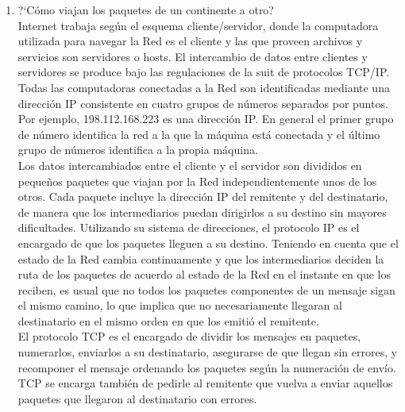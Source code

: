 \documentclass{article}
\begin{document}
\begin{enumerate}
\item ?`C\'omo viajan los paquetes de un continente a otro?\\
Internet trabaja seg\'un el esquema cliente/servidor, donde la computadora utilizada para navegar la Red es el cliente y las que proveen archivos y servicios son servidores o hosts. El intercambio de datos entre clientes y servidores se produce bajo las regulaciones de la suit de protocolos TCP/IP.\\ 
Todas las computadoras conectadas a la Red son identificadas mediante una direcci\'on IP consistente en cuatro grupos de n\'umeros separados por puntos. Por ejemplo, 198.112.168.223 es una direcci\'on IP. En general el primer grupo de n\'umero identifica la red a la que la m\'aquina est\'a conectada y el \'ultimo grupo de n\'umeros identifica a la propia m\'aquina.\\ 
Los datos intercambiados entre el cliente y el servidor son divididos en pequeños paquetes que viajan por la Red independientemente unos de los otros. Cada paquete incluye la direcci\'on IP del remitente y del destinatario, de manera que los intermediarios puedan dirigirlos a su destino sin mayores dificultades. Utilizando su sistema de direcciones, el protocolo IP es el encargado de que los paquetes lleguen a su destino. Teniendo en cuenta que el estado de la Red cambia continuamente y que los intermediarios deciden la ruta de los paquetes de acuerdo al estado de la Red en el instante en que los reciben, es usual que no todos los paquetes componentes de un mensaje sigan el mismo camino, lo que implica que no necesariamente llegaran al destinatario en el mismo orden en que los emiti\'o el remitente.\\ 
El protocolo TCP es el encargado de dividir los mensajes en paquetes, numerarlos, enviarlos a su destinatario, asegurarse de que llegan sin errores, y recomponer el mensaje ordenando los paquetes seg\'un la numeraci\'on de env\'io. TCP se encarga tambi\'en de pedirle al remitente que vuelva a enviar aquellos paquetes que llegaron al destinatario con errores.


\end{enumerate}
\end{document}
